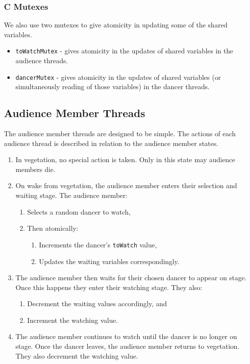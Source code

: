 \documentclass[12pt,a4paper]{scrartcl}
\begin{document}
\subsubsection{C Mutexes}
We also use two mutexes to give atomicity in updating some of the shared variables.
\begin{itemize}
    \item \texttt{toWatchMutex} - 
          gives atomicity in the updates of shared variables in the audience threads.
    \item \texttt{dancerMutex} - 
          gives atomicity in the updates of shared variables (or simultaneously reading of those variables) in the dancer threads.
\end{itemize}

\subsection{Audience Member Threads}
The audience member threads are designed to be simple.
The actions of each audience thread is described in relation to the audience member states.
\begin{enumerate}
    \item In vegetation, no special action is taken.
          Only in this state may audience members die.
    \item On wake from vegetation, the audience member enters their selection and waiting stage.
          The audience member:
    \begin{enumerate}
        \item Selects a random dancer to watch,
        \item Then atomically:
        \begin{enumerate}
            \item Increments the dancer's \texttt{toWatch} value,
            \item Updates the waiting variables correspondingly.
        \end{enumerate}
    \end{enumerate}
    \item The audience member then waits for their chosen dancer to appear on stage.
          Once this happens they enter their watching stage.
          They also:
          \begin{enumerate}
              \item Decrement the waiting values accordingly, and
              \item Increment the watching value.
          \end{enumerate}
    \item The audience member continues to watch until the dancer is no longer on stage.
          Once the dancer leaves, the audience member returns to vegetation.
          They also decrement the watching value.
\end{enumerate}
\end{document}
